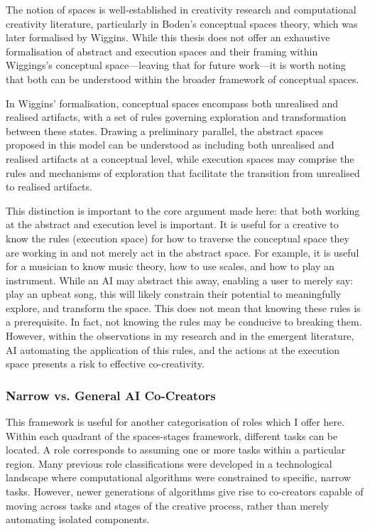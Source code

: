 The notion of spaces is well-established in creativity research and computational creativity literature, particularly in Boden's conceptual spaces theory, which was later formalised by Wiggins. While this thesis does not offer an exhaustive formalisation of abstract and execution spaces and their framing within Wiggings's conceptual space—leaving that for future work—it is worth noting that both can be understood within the broader framework of conceptual spaces.

In Wiggins' formalisation, conceptual spaces encompass both unrealised and realised artifacts, with a set of rules governing exploration and transformation between these states. Drawing a preliminary parallel, the abstract spaces proposed in this model can be understood as including both unrealised and realised artifacts at a conceptual level, while execution spaces may comprise the rules and mechanisms of exploration that facilitate the transition from unrealised to realised artifacts.

This distinction is important to the core argument made here: that both working at the abstract and execution level is important. It is useful for a creative to know the rules (execution space) for how to traverse the conceptual space they are working in and not merely act in the abstract space. For example, it is useful for a musician to know music theory, how to use scales, and how to play an instrument. While an AI may abstract this away, enabling a user to merely say: play an upbeat song, this will likely constrain their potential to meaningfully explore, and transform the space. This does not mean that knowing these rules is a prerequisite. In fact, not knowing the rules may be conducive to breaking them. However, within the observations in my research and in the emergent literature, AI automating the application of this rules, and the actions at the execution space presents a risk to effective co-creativity. 


\subsubsection{Narrow vs. General AI Co-Creators}

This framework is useful for another categorisation of roles which I offer here. Within each quadrant of the spaces-stages framework, different tasks can be located. A role corresponds to assuming one or more tasks within a particular region. Many previous role classifications were developed in a technological landscape where computational algorithms were constrained to specific, narrow tasks. However, newer generations of algorithms give rise to co-creators capable of moving across tasks and stages of the creative process, rather than merely automating isolated components.

